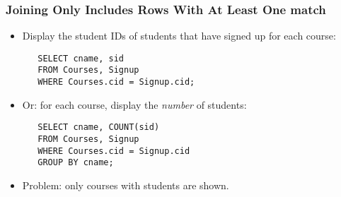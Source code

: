 \documentclass[dvipsnames]{beamer}
\begin{document}
\begin{frame}[fragile]
\frametitle{Joining Only Includes Rows With At Least One match}

\begin{itemize}
\item<+-> Display the student IDs of students that have signed up for each
  course:
  \begin{small}
\begin{verbatim}
   SELECT cname, sid
   FROM Courses, Signup
   WHERE Courses.cid = Signup.cid;
\end{verbatim}
  \end{small}


\item<+-> Or: for each course, display the \emph{number} of students:

  \begin{small}
\begin{verbatim}
   SELECT cname, COUNT(sid)
   FROM Courses, Signup
   WHERE Courses.cid = Signup.cid
   GROUP BY cname;
\end{verbatim}
  \end{small}


\item<+-> Problem: only courses with students are shown.
\end{itemize}
\end{frame}
\end{document}

